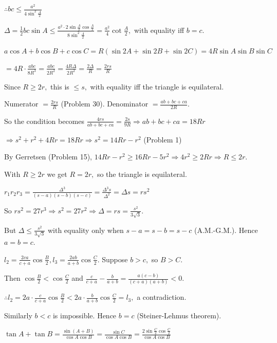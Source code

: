   $\therefore bc\leq \frac{a^2}{4\sin^2\frac{A}{2}}$

  $\Delta = \frac{1}{2}bc\sin A\leq \frac{a^2\cdot 2\sin\frac{A}{2}\cos\frac{A}{2}}{8\sin^2\frac{A}{2}} =
  \frac{a^2}{4}\cot\frac{A}{2},$ with equality iff $b = c.$
\item $a\cos A + b\cos B + c\cos C = R(\sin 2A + \sin 2B + \sin 2C) = 4R\sin A\sin B\sin C$

  $= 4R\cdot\frac{abc}{8R^3} = \frac{abc}{2R^2} = \frac{4R\Delta}{2R^2} = \frac{2\Delta}{R} = \frac{2rs}{R}$

  Since $R\geq 2r,$ this is $\leq s,$ with equality iff the triangle is equilateral.
\item Numerator $= \frac{2rs}{R}$ (Problem 30). Denominator $= \frac{ab + bc + ca}{2R}.$

  So the condition becomes $\frac{4rs}{ab + bc + ca} = \frac{2s}{9R}\Rightarrow ab + bc + ca = 18Rr$

  $\Rightarrow s^2 + r^2 + 4Rr = 18Rr\Rightarrow s^2 = 14Rr - r^2$ (Problem 1)

  By Gerretsen (Problem 15), $14Rr - r^2\geq 16Rr - 5r^2\Rightarrow 4r^2\geq 2Rr\Rightarrow R\leq 2r.$

  With $R\geq 2r$ we get $R = 2r,$ so the triangle is equilateral.
\item $r_1r_2r_3 = \frac{\Delta^3}{(s - a)(s - b)(s - c)} = \frac{\Delta^3 s}{\Delta^2} = \Delta s = rs^2$

  So $rs^2 = 27r^3\Rightarrow s^2 = 27r^2\Rightarrow \Delta = rs = \frac{s^2}{3\sqrt{3}}.$

  But $\Delta\leq \frac{s^2}{3\sqrt{3}}$ with equality only when $s - a = s - b = s - c$ (A.M.-G.M.). Hence $a = b = c.$
\item $l_2 = \frac{2ca}{c + a}\cos\frac{B}{2}, l_3 = \frac{2ab}{a + b}\cos\frac{C}{2}.$ Suppose $b > c,$ so $B > C.$

  Then $\cos\frac{B}{2} < \cos\frac{C}{2}$ and $\frac{c}{c + a} - \frac{b}{a + b} = \frac{a(c - b)}{(c + a)(a + b)} < 0.$

  $\therefore l_2 = 2a\cdot\frac{c}{c + a}\cos\frac{B}{2} < 2a\cdot\frac{b}{a + b}\cos\frac{C}{2} = l_3,$ a contradiction.

  Similarly $b < c$ is impossible. Hence $b = c$ (Steiner-Lehmus theorem).
\item $\tan A + \tan B = \frac{\sin(A + B)}{\cos A\cos B} = \frac{\sin C}{\cos A\cos B} = \frac{2\sin\frac{C}{2}\cos\frac{C}{2}}{\cos
  A\cos B}$

